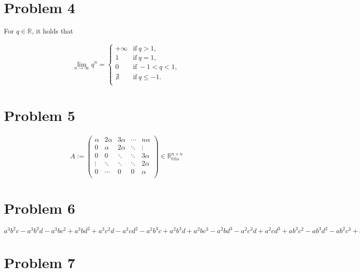 \documentclass[]{article}
\begin{document}
\section*{Problem 4}

For $q \in \mathbb{R}$, it holds that

\begin{align*}
	\lim\limits_{n \to \infty} q^n = 
	\left\{
	\begin{array}{ll}
		+\infty & \textrm{if}\ q > 1, \\
		1 & \textrm{if}\ q = 1, \\
		0 & \textrm{if}\ -1 < q < 1, \\
		\nexists & \textrm{if}\ q \leq -1. \\
	\end{array}
	\right.
\end{align*}


\section*{Problem 5}

\begin{align*}
	A := \left(
	\begin{array}{ccccc}
		\alpha & 2\alpha & 3\alpha & \cdots & n\alpha \\
		0      & \alpha  & 2\alpha & \ddots & \vdots  \\
		0      & 0       & \ddots  & \ddots & 3\alpha \\
		\vdots & \ddots  & \ddots  & \ddots & 2\alpha \\
		0      & \cdots  & 0       & 0      & \alpha  \\
	\end{array}
	\right) \in \mathbb{R}^{n \times n}_{\textrm{tria}}
\end{align*}


\section*{Problem 6}

$a^{3} b^{2} c - a^{3} b^{2} d - a^{3} b c^{2} + a^{3} b d^{2} + a^{3} c^{2} d - a^{3} c d^{2} - a^{2} b^{3} c + a^{2} b^{3} d + a^{2} b c^{3} - a^{2} b d^{3} - a^{2} c^{3} d + a^{2} c d^{3} + a b^{3} c^{2} - a b^{3} d^{2} - a b^{2} c^{3} + a b^{2} d^{3} + a c^{3} d^{2} - a c^{2} d^{3} - b^{3} c^{2} d + b^{3} c d^{2} + b^{2} c^{3} d - b^{2} c d^{3} - b c^{3} d^{2} + b c^{2} d^{3}$

\section*{Problem 7}
\end{document}
